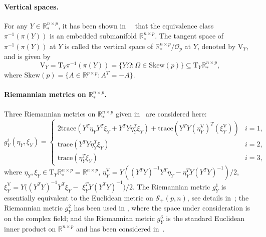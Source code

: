 \documentclass[11pt]{article}
\numberwithin{equation}{section}
\begin{document}
\paragraph{Vertical spaces.}
For any $Y \in \mathbb{R}_*^{n \times p}$, it has been shown in~~\cite[Proposition 3.4.4]{AbsMahSep2008} that the equivalence class $\pi^{-1}(\pi(Y))$ is an embedded submanifold $\mathbb{R}_*^{n \times p}$. The tangent space of $\pi^{-1}(\pi(Y))$ at $Y$ is called the vertical space of $\mathbb{R}_*^{n \times p}/\mathcal{O}_p$ at $Y$, denoted by $\mathrm{V}_Y$, and is given by 
\[
  \mathrm{V}_Y=\mathrm{T}_Y \pi^{-1}(\pi(Y))=\{Y\Omega: \Omega  \in \mathrm{Skew}(p)\} \subseteq \mathrm{T}_Y\mathbb{R}_*^{n\times p},
\]
  where %
  $\mathrm{Skew}(p) = \{A\in\mathbb{R}^{p\times p}: A^T=-A\}$. 
 
\paragraph{Riemannian metrics on $\mathbb{R}_*^{n\times p}$.} Three Riemannian metrics on $\mathbb{R}_*^{n\times p}$ given in~\cite{Zheng2022RiemannianOU} are considered here: 
\begin{equation} \label{Rmetrics}
g^{i}_Y(\eta_Y,\xi_Y) = 
\begin{cases}	
	2\mathrm{trace}(Y^T\eta_YY^T\xi_Y+Y^TY\eta_Y^T\xi_Y) 
        +\mathrm{trace}\left(Y^TY(\eta_Y^{\mathrm{V}})^T(\xi_Y^{\mathrm{V}})\right) &  i = 1,  \\
	\mathrm{trace}(Y^TY\eta_Y^T\xi_Y) & i = 2,  \\
	\mathrm{trace}(\eta_Y^T\xi_Y)  & i = 3,  
\end{cases}
\end{equation}
where $\eta_Y,\xi_Y\in \mathrm{T}_Y\mathbb{R}_*^{n\times p} = \mathbb{R}^{n \times p}$, $\eta_Y^{\mathrm{V}}= Y \left( (Y^TY)^{-1}Y^T \eta_Y-\eta_Y^T Y(Y^TY)^{-1} \right) / 2$, $\xi_Y^{\mathrm{V}} = Y ( (Y^TY)^{-1}Y^T \xi_Y-$ $\xi_Y^T Y(Y^TY)^{-1} ) / 2$.
The Riemannian metric $g^1_Y$ is essentially equivalent to the Euclidean metric on $\mathcal{S}_+(p,n)$, see details in~\cite{Zheng2022RiemannianOU}; the Riemannian metric $g_Y^2$ has been used in \cite{HUANG2017}, where the space under consideration is on the complex field; and the Riemannian metric $g_Y^3$ is the standard Euclidean inner product on $\mathbb{R}^{n\times p}$ and has been considered in~\cite{MA20}.
\end{document}
